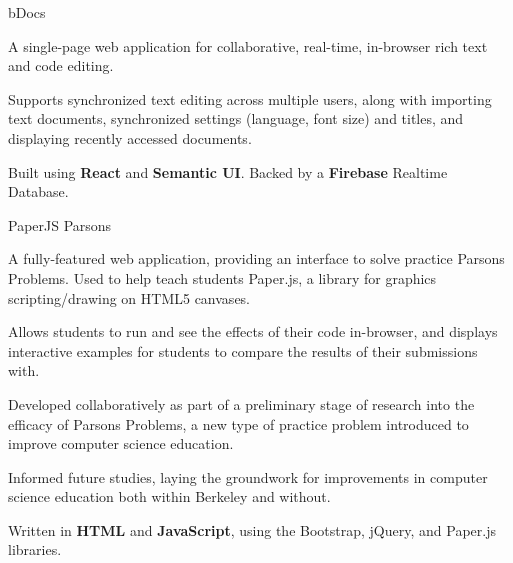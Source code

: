 

\begin{cventries}

  \cventry
    {} %
    {bDocs} %
    {} %
    {} %
    {
      \vspace{-9mm}
      \begin{cvprojectitems}
        \item A single-page web application for collaborative, real-time, in-browser rich text and code editing.
        \item Supports synchronized text editing across multiple users, along with importing text documents, synchronized settings (language, font size) and titles, and displaying recently accessed documents.
        \item Built using \textbf{React} and \textbf{Semantic UI}. Backed by a \textbf{Firebase} Realtime Database. 
      \end{cvprojectitems}
    }

  \vspace{-3mm}
  \cventry
    {} %
    {PaperJS Parsons} %
    {} %
    {} %
    {
      \begin{cvprojectitems}
        \vspace{-9mm}
        \item A fully-featured web application, providing an interface to solve practice Parsons Problems. Used to help teach students Paper.js, a library for graphics scripting/drawing on HTML5 canvases.
        \item Allows students to run and see the effects of their code in-browser, and displays interactive examples for students to compare the results of their submissions with.
        \item Developed collaboratively as part of a preliminary stage of research into the efficacy of Parsons Problems, a new type of practice problem introduced to improve computer science education.
        \item Informed future studies, laying the groundwork for improvements in computer science education both within Berkeley and without.
        \item Written in \textbf{HTML} and \textbf{JavaScript}, using the Bootstrap, jQuery, and Paper.js libraries.
      \end{cvprojectitems}
    }
\end{cventries}
